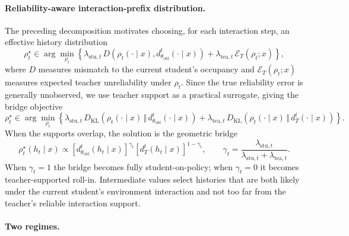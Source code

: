 \paragraph{Reliability-aware interaction-prefix distribution.}

The preceding decomposition motivates choosing, for each interaction step, an
effective history distribution
\[
\rho_t^\star
\in
\arg\min_{\rho_t}
\left\{
\lambda_{\mathrm{stu},t}\,
D\left(
\rho_t(\cdot\mid x),
d_{\theta_{\mathrm{old}}}^{t}(\cdot\mid x)
\right)
+
\lambda_{\mathrm{tea},t}\,
\mathcal E_T(\rho_t;x)
\right\},
\]
where \(D\) measures mismatch to the current student's occupancy and
\(\mathcal E_T(\rho_t;x)\) measures expected teacher unreliability under \(\rho_t\).
Since the true reliability error is generally unobserved, we use teacher support as a
practical surrogate, giving the bridge objective
\begin{equation}
\label{eq:bridge-obj}
\rho_t^\star
\in
\arg\min_{\rho_t}
\left\{
\lambda_{\mathrm{stu},t}\,
D_{\mathrm{KL}}
\left(
\rho_t(\cdot\mid x)
\,\Vert\,
d_{\theta_{\mathrm{old}}}^{t}(\cdot\mid x)
\right)
+
\lambda_{\mathrm{tea},t}\,
D_{\mathrm{KL}}
\left(
\rho_t(\cdot\mid x)
\,\Vert\,
d_T^{t}(\cdot\mid x)
\right)
\right\}.
\end{equation}
When the supports overlap, the solution is the geometric bridge
\begin{equation}
\label{eq:bridge}
\rho_t^\star(h_t\mid x)
\propto
\left[
d_{\theta_{\mathrm{old}}}^{t}(h_t\mid x)
\right]^{\gamma_t}
\left[
d_T^{t}(h_t\mid x)
\right]^{1-\gamma_t},
\qquad
\gamma_t
=
\frac{\lambda_{\mathrm{stu},t}}{\lambda_{\mathrm{stu},t}+\lambda_{\mathrm{tea},t}}.
\end{equation}
When \(\gamma_t=1\) the bridge becomes fully student-on-policy; when \(\gamma_t=0\) it
becomes teacher-supported roll-in. Intermediate values select histories that are both
likely under the current student's environment interaction and not too far from the
teacher's reliable interaction support.

\paragraph{Two regimes.}


